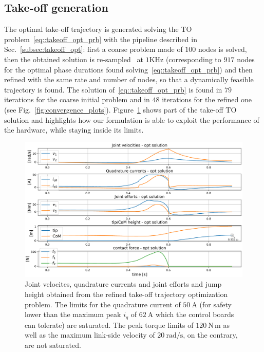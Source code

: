 \subsection{Take-off generation}
The optimal take-off trajectory is generated solving the TO problem~\eqref{eq::takeoff_opt_prb} with the pipeline described in Sec.~\ref{subsec:takeoff_opt}: first a coarse problem made of $100$ nodes is solved, then the obtained solution is re-sampled~\cite{to::horizon_to} at  $1\mathrm{KHz}$ (corresponding to $917$ nodes for the optimal phase durations found solving~\eqref{eq::takeoff_opt_prb}) and then refined with the same rate and number of nodes, so that a dynamically feasible trajectory is found. The solution of~\eqref{eq::takeoff_opt_prb} is found in $79$ iterations for the coarse initial problem and in $48$ iterations for the refined one (see Fig.~\ref{fig:convergence_plots}). 
Figure~\ref{fig:takeoff_opt_data} shows part of the take-off TO solution and highlights how our formulation is able to exploit the performance of the hardware, while staying inside its limits. 
\begin{figure}[h]
	\centering
	\includegraphics[width=1\columnwidth]{images/hardware_saturation_opt.pdf}
	\caption{Joint velocites, quadrature currents and joint efforts and jump height obtained from the refined take-off trajectory optimization problem. The limits for the quadrature current of $50~\mathrm{A}$ (for safety lower than the maximum peak $i_q$ of $62~\mathrm{A}$ which the control boards can tolerate) are saturated. The peak torque limits of $120~\mathrm{N\,m}$ as well as the maximum link-side velocity of $20~\mathrm{rad/s}$, on the contrary, are not saturated.\vspace{-0.3cm}}
	\label{fig:takeoff_opt_data}
\end{figure}
